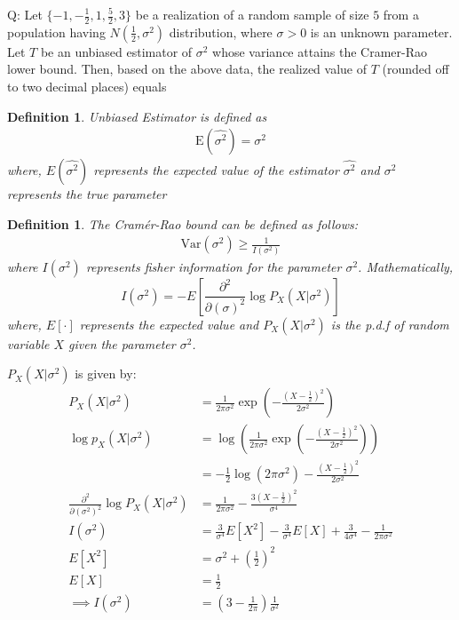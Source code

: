 \documentclass[journal,12pt,onecolumn]{IEEEtran}
\newtheorem{definition}[problem]{Definition}
\theoremstyle{remark}
\begin{document}
\let\vec\mathbf




\vspace{3cm}



\bigskip

\renewcommand{\thefigure}{\theenumi}
\renewcommand{\thetable}{\theenumi}
Q: Let $\{-1, -\frac{1}{2}, 1, \frac{5}{2}, 3\}$ be a realization of a random sample of size $5$ from a population having $N\left(\frac{1}{2}, \sigma^2\right)$ distribution, where $\sigma > 0$ is an unknown parameter. Let $T$ be an unbiased estimator of $\sigma^2$ whose variance attains the Cramer-Rao lower bound. Then, based on the above data, the realized value of $T$ (rounded off to two decimal places) equals
\\ \solution
\begin{definition}
Unbiased Estimator is defined as
\begin{align}
\text{E}(\hat{\sigma^2}) = {\sigma^2}
\end{align}
where, \(E(\hat{\sigma^2})\) represents the expected value of the estimator \(\hat{\sigma^2}\) and \(\sigma^2\) represents the true parameter
\end{definition}
\begin{definition}
The Cramér-Rao bound can be defined as follows:
\begin{align}
\text{Var}(\sigma^2) \geq \frac{1}{I(\sigma^2)}
\end{align}
where $I(\sigma^2)$ represents fisher information for the parameter $\sigma^2$.
Mathematically,
\begin{equation*}
I(\sigma^2) = -E\left [\frac{\partial^2}{\partial(\sigma)^2}\log P_{X}(X|\sigma^2)\right]
\end{equation*}
where, $E[\cdot]$ represents the expected value and $P_{X}(X|\sigma^2)$ is the p.d.f of random variable $X$ given the parameter $\sigma^2$. 
\end{definition}
$P_X(X|\sigma^2)$ is given by:
\begin{align}
P_X(X|\sigma^2) &= \frac{1}{2\pi\sigma^2} \exp\left(-\frac{(X-\frac{1}{2})^2}{2\sigma^2}\right)\\
\log p_X(X|\sigma^2) &= \log\left(\frac{1}{2\pi\sigma^2} \exp\left(-\frac{(X-\frac{1}{2})^2}{2\sigma^2}\right)\right)\\
&= -\frac{1}{2}\log(2\pi\sigma^2) - \frac{(X-\frac{1}{2})^2}{2\sigma^2}\\
\frac{\partial^2}{\partial(\sigma^2)^2}\log P_X(X|\sigma^2) &= \frac{1}{2\pi\sigma^2} - \frac{3(X-\frac{1}{2})^2}{\sigma^4}\\
I(\sigma^2) &= \frac{3}{\sigma^4} E[X^2] - \frac{3}{\sigma^4} E[X] + \frac{3}{4\sigma^4} - \frac{1}{2\pi\sigma^2}\\
E[X^2] &= \sigma^2 + \left(\frac{1}{2}\right)^2\\
E[X] &= \frac{1}{2}\\
\implies I(\sigma^2) &= \left(3 - \frac{1}{2\pi}\right) \frac{1}{\sigma^2}
\end{align}
\end{document}

